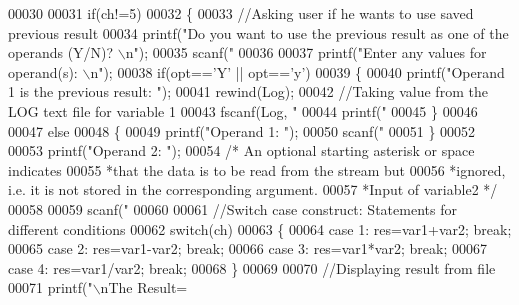 \begin{DoxyCode}
{{00030       
00031       \textcolor{keywordflow}{if}(ch!=5)
00032       \{
00033         \textcolor{comment}{//Asking user if he wants to use saved previous result}
00034         printf(\textcolor{stringliteral}{"Do you want to use the previous result as one of the operands (Y/N)? \(\backslash\)n"});
00035         scanf(\textcolor{stringliteral}{" %
00036       
00037         printf(\textcolor{stringliteral}{"Enter any values for operand(s): \(\backslash\)n"});
00038         \textcolor{keywordflow}{if}(opt==\textcolor{charliteral}{'Y'} || opt==\textcolor{charliteral}{'y'})
00039           \{
00040             printf(\textcolor{stringliteral}{"Operand 1 is the previous result: "});
00041             rewind(Log);
00042             \textcolor{comment}{//Taking value from the LOG text file for variable 1}
00043             fscanf(Log, \textcolor{stringliteral}{" %
00044             printf(\textcolor{stringliteral}{"%
00045           \}  
00046       
00047         \textcolor{keywordflow}{else} 
00048         \{
00049           printf(\textcolor{stringliteral}{"Operand 1: "}); 
00050           scanf(\textcolor{stringliteral}{"%
00051         \}
00052         
00053         printf(\textcolor{stringliteral}{"Operand 2: "}); 
00054         \textcolor{comment}{/* An optional starting asterisk or space indicates }
00055 \textcolor{comment}{        *that the data is to be read from the stream but }
00056 \textcolor{comment}{        *ignored, i.e. it is not stored in the corresponding argument.  }
00057 \textcolor{comment}{        *Input of variable2 */}
00058         
00059         scanf(\textcolor{stringliteral}{" %
00060         
00061         \textcolor{comment}{//Switch case construct: Statements for different conditions }
00062         \textcolor{keywordflow}{switch}(ch)                                              
00063         \{
00064           \textcolor{keywordflow}{case} 1: res=var1+var2; \textcolor{keywordflow}{break};
00065           \textcolor{keywordflow}{case} 2: res=var1-var2; \textcolor{keywordflow}{break};
00066           \textcolor{keywordflow}{case} 3: res=var1*var2; \textcolor{keywordflow}{break};
00067           \textcolor{keywordflow}{case} 4: res=var1/var2; \textcolor{keywordflow}{break};
00068         \}
00069          
00070         \textcolor{comment}{//Displaying result from file}
00071         printf(\textcolor{stringliteral}{"\(\backslash\)nThe Result= %
}}}}}}}}
\end{DoxyCode}
